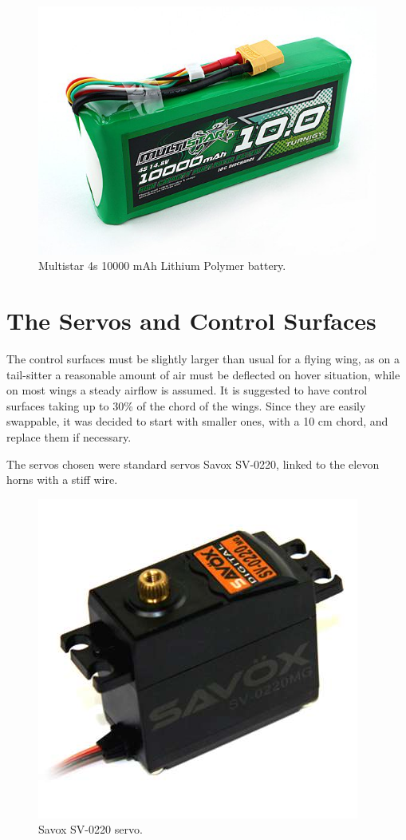 \begin{figure}[H]
\centering
  \includegraphics[width=0.8\linewidth]{figs/battery.jpg}
  \caption{Multistar 4s 10000 mAh Lithium Polymer battery.}
  \label{fig:multistar}
\end{figure}


\section{The Servos and Control Surfaces}

The control surfaces must be slightly larger than usual for a flying wing, as on a tail-sitter a reasonable amount of air must be deflected on hover situation, while on most wings a steady airflow is assumed. It is suggested to have control surfaces taking up to 30\% of the chord of the wings. Since they are easily swappable, it was decided to start with smaller ones, with a 10 cm chord, and replace them if necessary.


The servos chosen were standard servos Savox SV-0220, linked to the elevon horns with a stiff wire. %

\begin{figure}[H]
\centering
  \includegraphics[width=0.6\linewidth]{figs/servo.jpg}
  \caption{Savox SV-0220 servo.}
  \label{fig:sv-0220}
\end{figure}


